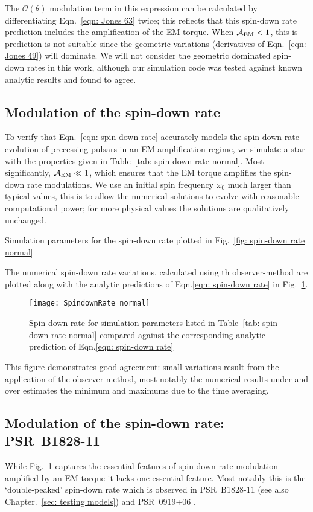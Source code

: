 \documentclass[../full_thesis/full_thesis.tex]{subfiles}
\begin{document}
The $\mathcal{O}(\theta)$ modulation term in this expression can be calculated
by differentiating Eqn.~\eqref{eqn: Jones 63} twice; this reflects that this
spin-down rate prediction includes the amplification of the EM torque. When
$\mathcal{A}_{\mathrm{EM}} < 1$, this is prediction is not suitable since the geometric variations
(derivatives of Eqn.~\eqref{eqn: Jones 49}) will dominate. We will not consider
the geometric dominated spin-down rates in this work, although our simulation
code was tested against known analytic results and found to agree.

\subsection{Modulation of the spin-down rate}
To verify that Eqn.~\eqref{eqn: spin-down rate} accurately models the spin-down
rate evolution of precessing pulsars in an EM amplification regime, we simulate
a star with the properties given in Table~\ref{tab: spin-down rate normal}.
Most significantly, $\mathcal{A}_{\mathrm{EM}} \ll 1$, which ensures that the EM torque amplifies
the spin-down rate modulations. We use an initial spin frequency $\omega_0$
much larger than typical values, this is to allow the numerical solutions to
evolve with reasonable computational power; for more physical values the
solutions are qualitatively unchanged.
\begin{table}[htb]
\centering

\caption{Simulation parameters for the spin-down rate plotted in Fig.~\ref{fig:
spin-down rate normal}}
\label{tab: spin-down rate normal}
\end{table}

The numerical spin-down rate variations, calculated using th observer-method
are plotted along with the analytic predictions of Eqn.\eqref{eqn: spin-down rate}
in Fig.~\ref{fig: spin-down rate normal}.
\begin{figure}[htb]
\centering
\texttt{[image: SpindownRate\_normal]}
\caption{Spin-down rate for simulation parameters listed in Table~\ref{tab:
spin-down rate normal} compared against the corresponding analytic prediction
of Eqn.\eqref{eqn: spin-down rate} }
\label{fig: spin-down rate normal}
\end{figure}
This figure demonstrates good agreement: small variations result from the
application of the observer-method, most notably the numerical results under
and over estimates the minimum and maximums due to the time averaging.

\subsection{Modulation of the spin-down rate: PSR~B1828-11} While
Fig.~\ref{fig: spin-down rate normal} captures the essential features of
spin-down rate modulation amplified by an EM torque it lacks one essential
feature. Most notably this is the `double-peaked' spin-down rate which is
observed in PSR~B1828-11 \citep{Lyne2010} (see also Chapter.~\ref{sec: testing
models}) and PSR~0919+06 \citep{Perera2015}.
\end{document}
